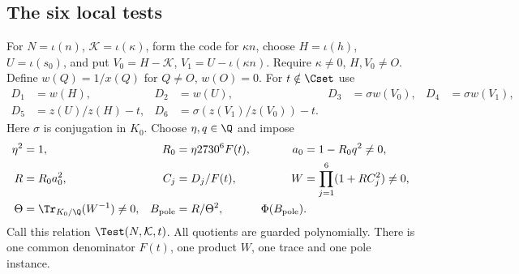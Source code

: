 \subsection{The six local tests}
For $N=\iota(n)$, $\mathcal K=\iota(\kappa)$, form the code for
$\kappa n$, choose $H=\iota(h)$, $U=\iota(s_0)$, and put
$V_0=H-\mathcal K$, $V_1=U-\iota(\kappa n)$.
Require $\kappa\ne0$, $H,V_0\ne O$. Define $w(Q)=1/x(Q)$ for
$Q\ne O$, $w(O)=0$. For $t\notin\Cset$ use
\begin{align*}
 D_1&=w(H),&D_2&=w(U),&D_3&=\sigma w(V_0),&D_4&=\sigma w(V_1),\\
 D_5&=z(U)/z(H)-t,&D_6&=\sigma(z(V_1)/z(V_0))-t.
\end{align*}
Here $\sigma$ is conjugation in $K_0$. Choose $\eta,q\in\Q$ and impose
\begin{align*}
 \eta^2&=1,&R_0&=\eta2730^6F(t),&a_0&=1-R_0q^2\ne0,\\
 R&=R_0a_0^2,&C_j&=D_j/F(t),&W&=\prod_{j=1}^6(1+RC_j^2)\ne0,\\
 \Theta&=\Tr_{K_0/\Q}(W^{-1})\ne0,&B_{\rm pole}&=R/\Theta^2,
 &\Phi(B_{\rm pole})&.
\end{align*}
Call this relation $\Test(N,\mathcal K,t)$. All quotients are guarded
polynomially. There is one common denominator $F(t)$, one product $W$,
one trace and one pole instance.

